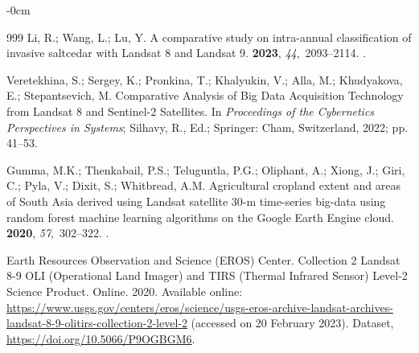 \documentclass[jimaging,article,accept,pdftex,moreauthors]{Definitions/mdpi}
\begin{document}
\begin{adjustwidth}{-\extralength}{0cm}
\begin{thebibliography}{999}
Li, R.; Wang, L.; Lu, Y.
\newblock A comparative study on intra-annual classification of invasive
  saltcedar with Landsat 8 and Landsat 9.
 {\bf 2023}, {\em
  44},~2093--2114.
.

Veretekhina, S.; Sergey, K.; Pronkina, T.; Khalyukin, V.; Alla, M.; Khudyakova,
  E.; Stepantsevich, M.
\newblock Comparative Analysis of Big Data Acquisition Technology from Landsat
  8 and Sentinel-2 Satellites.
\newblock In \emph{Proceedings of the Cybernetics Perspectives in Systems}; Silhavy,
  R., Ed.; Springer: Cham, Switzerland, %
 2022; pp. 41--53.

Gumma, M.K.; Thenkabail, P.S.; Teluguntla, P.G.; Oliphant, A.; Xiong, J.; Giri,
  C.; Pyla, V.; Dixit, S.; Whitbread, A.M.
\newblock Agricultural cropland extent and areas of South Asia derived using
  Landsat satellite 30-m time-series big-data using random forest machine
  learning algorithms on the Google Earth Engine cloud.
 {\bf 2020}, {\em 57},~302--322.
.

{Earth Resources Observation and Science (EROS) Center}.
\newblock Collection 2 Landsat 8-9 OLI (Operational Land Imager) and TIRS
  (Thermal Infrared Sensor) Level-2 Science Product. %
\newblock Online. 2020.
\newblock  Available online: \url{https://www.usgs.gov/centers/eros/science/usgs-eros-archive-landsat-archives-landsat-8-9-olitirs-collection-2-level-2} (accessed on 20 February 2023).
\newblock Dataset, {\url{https://doi.org/10.5066/P9OGBGM6}}.


\end{thebibliography}
\end{adjustwidth}
\end{document}
